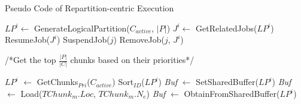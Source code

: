 \documentclass[10pt,journal,compsoc]{IEEEtran}
\begin{document}
\begin{algorithm}[t]
	\caption{Pseudo Code of Repartition-centric Execution}
	\begin{algorithmic}[1]
		\State $LP^i \leftarrow$ GenerateLogicalPartition($C_{active}$, $|P|$) \label{getpartition}
		\State $J^i \leftarrow$ GetRelatedJobs($LP^i$) \label{getjobs}
		\State ResumeJob($J^i$)\label{resume}
		 \label{suspend1}
		\State SuspendJob($j$)
		\EndIf \label{suspend2}
		\State RemoveJob($j$, $J^i$) \label{Remove}
		\State {} \label{return}
		\EndProcedure
		
		\State /*Get the top $\frac{|P|}{|C|}$ chunks based on their priorities*/
		\par\setlength\parindent{1.5em} $LP^i$ $\leftarrow$ GetChunks$_{Pri}$($C_{active}$) \label{SortAID}
		\State Sort$_{ID}$($LP^i$) \label{SortID}
		 \label{not}
		\State \textit{Buf} $\leftarrow$ SetSharedBuffer($LP^i$) \label{create}
		\label{load1}
		\State \textit{Buf} $\leftarrow$ Load($TChunk_m.Loc$, $TChunk_m.N_e$)
		\EndFor \label{load2}
		\Else
		\State\textit{Buf} $\leftarrow$ ObtainFromSharedBuffer($LP^i$) \label{attach}
		\EndIf
		\State {} \label{returnLP}
		\EndProcedure
	\end{algorithmic}
	\label{code3}
\end{algorithm}
\end{document}
